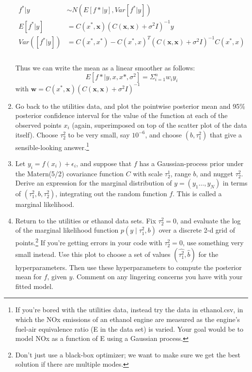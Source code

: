 \documentclass{homework}
\newcommand{\1}{\mathbf{1}}
\begin{document}
\begin{enumerate}[label=(\Alph*)]
\begin{equation}
\begin{split}
 f^* | y & \sim N( E[f* | y], Var[f^*|y]) \\
 E[f^* | y] & = C(x^*, \textbf{x}) (C(\textbf{x},\textbf{x}) + \sigma^2I)^{-1} y \\
 Var([f^*|y]) &= C(x^*, x^*) - C(x^*, x)^T(C(\textbf{x},\textbf{x}) + \sigma^2I)^{-1}C(x^*, x) \\
\end{split} \end{equation}
\\Thus we can write the mean as a linear smoother as follows:
$$E[ f* | y, x, x*, \sigma^2 ] = \Sigma_{i=1}^{n} w_i y_i $$
with $\textbf{w} = C(x^*, \textbf{x}) (C(\textbf{x},\textbf{x}) + \sigma^2I)^{-1} $

\item Go back to the utilities data, and plot the pointwise posterior mean and 95\% posterior confidence interval for the value of the function at each of the observed points $x_i$ (again, superimposed on top of the scatter plot of the data itself).  Choose $\tau^2_2$ to be very small, say $10^{-6}$, and choose $(b, \tau^2_1)$ that give a sensible-looking answer.\footnote{If you're bored with the utilities data, instead try the data in ethanol.csv, in which the NOx emissions of an ethanol engine are measured as the engine's fuel-air equivalence ratio (E in the data set) is varied.  Your goal would be to model NOx as a function of E using a Gaussian process. }

\item Let $y_i = f(x_i) + \epsilon_i$, and suppose that $f$ has a Gaussian-process prior under the Matern(5/2) covariance function $C$ with scale $\tau^1_2$, range $b$, and nugget $\tau^2_2$.  Derive an expression for the marginal distribution of $y = (y_1 \ldots, y_N)$ in terms of $(\tau^2_1, b, \tau^2_2)$, integrating out the random function $f$.  This is called a marginal likelihood.

\item Return to the utilities or ethanol data sets. Fix $\tau^2_2 = 0$, and evaluate the log of the marginal likelihood function $p(y \mid \tau^2_1, b)$ over a discrete 2-d grid of points.\footnote{Don't just use a black-box optimizer; we want to make sure we get the best solution if there are multiple modes.} If you're getting errors in your code with $\tau^2_2 = 0$, use something very small instead.  Use this plot to choose a set of values $(\hat{\tau^2_1}, \hat{b})$ for the hyperparameters.  Then use these hyperparameters to compute the posterior mean for $f$, given $y$.  Comment on any lingering concerns you have with your fitted model.


\end{enumerate}
\end{document}
